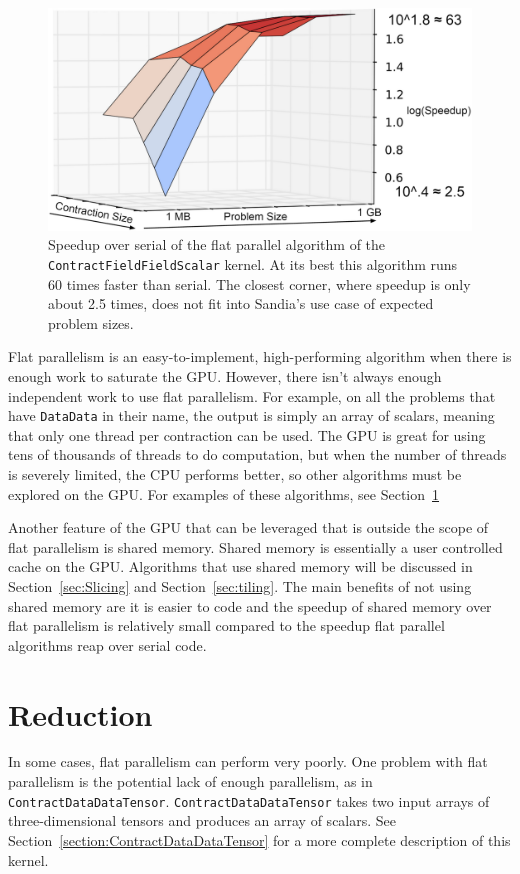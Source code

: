 \begin{figure}[!ht]
\includegraphics[width=5in]{CFFSIndependent2.PNG}
\caption[Performance of \texttt{ContractFieldFieldScalar} flat parallel]
{Speedup over serial of the flat parallel algorithm of the
\texttt{ContractFieldFieldScalar} kernel. At its best this algorithm runs 60
times faster than serial. The closest corner, where speedup is only about 2.5
times, does not fit into Sandia's use case of expected problem sizes.
\label{lst:ContractFieldFieldScalar speedup over serial}} 
\end{figure}

Flat parallelism is an easy-to-implement, high-performing algorithm when there
is enough work to saturate the GPU. However, there isn't always enough
independent work to use flat parallelism. For example, on all the problems that
have \texttt{DataData} in their name, the output is simply an array of scalars,
meaning that only one thread per contraction can be used. The GPU is great for
using tens of thousands of threads to do computation, but when the number of
threads is severely limited, the CPU performs better, so other algorithms must
be explored on the GPU.  For examples of these algorithms, see
Section~\ref{sec:reduction}

Another feature of the GPU that can be leveraged that is outside the scope of
flat parallelism is shared memory. Shared memory is essentially a user
controlled cache on the GPU. Algorithms that use shared memory will be discussed
in Section~\ref{sec:Slicing} and Section~\ref{sec:tiling}. The main benefits of not
using shared memory are it is easier to code and the speedup of shared memory
over flat parallelism is relatively small compared to the speedup flat parallel
algorithms reap over serial code. 

\section{Reduction} \label{sec:reduction}
In some cases, flat parallelism can perform very poorly.  One problem with flat
parallelism is the potential lack of enough parallelism, as in
\texttt{ContractDataDataTensor}.  \texttt{ContractDataDataTensor} takes two
input arrays of three-dimensional tensors and produces an array of scalars.  See
Section~\ref{section:ContractDataDataTensor} for a more complete description of
this kernel.

